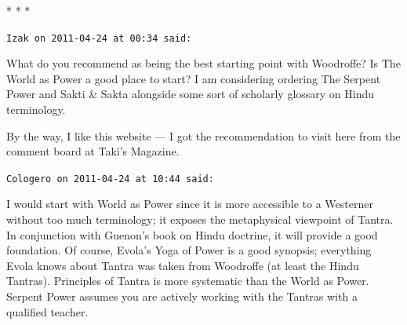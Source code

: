 
\begin{center}* * *\end{center}

\begin{footnotesize}\begin{sffamily}



\texttt{Izak on 2011-04-24 at 00:34 said: }

What do you recommend as being the best starting point with Woodroffe? Is The World as Power a good place to start? I am considering ordering The Serpent Power and Sakti \& Sakta alongside some sort of scholarly glossary on Hindu terminology.

By the way, I like this website — I got the recommendation to visit here from the comment board at Taki's Magazine.


\hfill

\texttt{Cologero on 2011-04-24 at 10:44 said: }

I would start with World as Power since it is more accessible to a Westerner without too much terminology; it exposes the metaphysical viewpoint of Tantra. In conjunction with Guenon's book on Hindu doctrine, it will provide a good foundation. Of course, Evola's Yoga of Power is a good synopsis; everything Evola knows about Tantra was taken from Woodroffe (at least the Hindu Tantras). Principles of Tantra is more systematic than the World as Power. Serpent Power assumes you are actively working with the Tantras with a qualified teacher.


\end{sffamily}\end{footnotesize}

